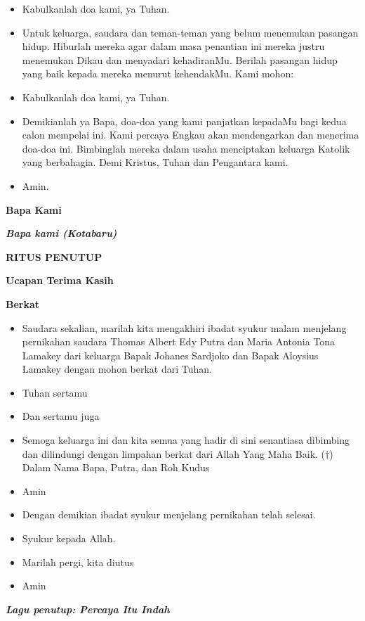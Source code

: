 \documentclass[a5paper,headsepline,titlepage,11pt,nnormalheadings]{scrartcl}
\makeatletter
\newcommand{\judul}[1]{%
  {\parindent \z@ \centering \normalfont
    \interlinepenalty\@M \Large \bfseries #1\par\nobreak \vskip 20\p@ }}
\newcommand{\subjudul}[1]{%
  {\parindent \z@ \normalfont
    \interlinepenalty\@M \bfseries #1\par\nobreak \vskip 20\p@ }}
\newcommand{\lagu}[1]{%
  {\parindent \z@ \normalfont
    \interlinepenalty\@M \bfseries \emph{#1}\par\nobreak \vskip 20\p@ }}
\newcommand{\BU}[1]{\begin{itemize} \item[U:] #1 \end{itemize}}
\newcommand{\BP}[1]{\begin{itemize} \item[P:] #1 \end{itemize}}
\newcommand{\keluargatri}{Aloysius Lamakey }
\newcommand{\keluargatra}{Johanes Sardjoko }
\newcommand{\camantri}{Maria Antonia Tona Lamakey }
\newcommand{\camantra}{Thomas Albert Edy Putra }
\newcommand{\lagubapakami}{Bapa kami (Kotabaru) }
\newcommand{\lagupenutup}{Percaya Itu Indah }
\makeatother
\begin{document}
\BU{Kabulkanlah doa kami, ya Tuhan.}

\BP{Untuk keluarga, saudara dan teman-teman yang belum menemukan pasangan
hidup. Hiburlah mereka agar dalam masa penantian ini mereka justru menemukan
Dikau dan menyadari kehadiranMu. Berilah pasangan hidup yang baik kepada mereka
menurut kehendakMu. Kami mohon:}

\BU{Kabulkanlah doa kami, ya Tuhan.}

\BP{Demikianlah ya Bapa, doa-doa
yang kami panjatkan kepadaMu bagi kedua calon mempelai ini. Kami percaya Engkau akan
mendengarkan dan menerima doa-doa ini. Bimbinglah mereka dalam usaha
menciptakan keluarga Katolik yang berbahagia. Demi Kristus, Tuhan dan
Pengantara kami.}

\BU{Amin.}


\subjudul{Bapa Kami}
\lagu{\lagubapakami}

\judul{RITUS PENUTUP}

\subjudul{Ucapan Terima Kasih}

\subjudul{Berkat}

\BP{Saudara sekalian, marilah kita mengakhiri ibadat syukur malam menjelang pernikahan saudara \camantra dan \camantri dari keluarga Bapak \keluargatra dan Bapak \keluargatri  dengan mohon berkat dari Tuhan.}
\BP{Tuhan sertamu}
\BU{Dan sertamu juga}
\BP{Semoga keluarga ini dan kita semua yang hadir di sini senantiasa dibimbing dan dilindungi dengan limpahan berkat dari Allah Yang Maha Baik. ($\dagger$) Dalam Nama Bapa, Putra, dan Roh Kudus}
\BU{Amin}
\BP{Dengan demikian ibadat syukur menjelang pernikahan telah selesai.}
\BU{Syukur kepada Allah.}
\BP{Marilah pergi, kita diutus}
\BU{Amin}

\lagu{Lagu penutup: \lagupenutup}

%
%
%
%
%
%
%
\end{document}
